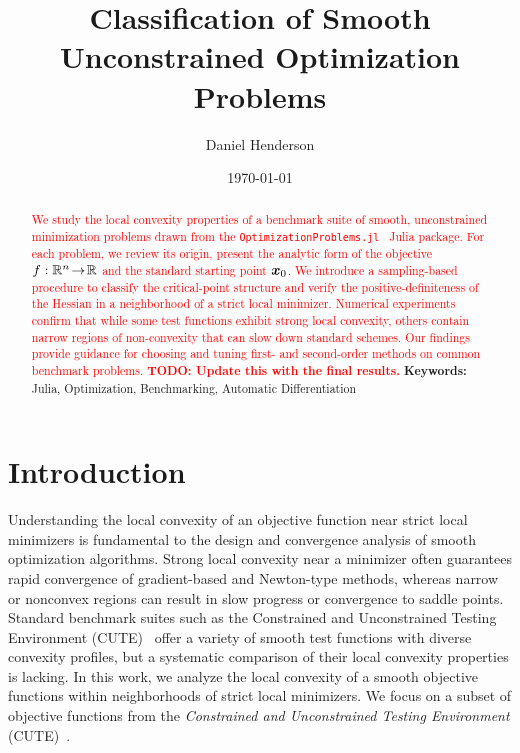 \documentclass[10pt]{article}
\title{Classification of Smooth Unconstrained Optimization Problems}
\author{Daniel Henderson}
\date{\today}
\begin{document}
\maketitle

\begin{abstract}
    \noindent
    \textcolor{Red}{
    We study the local convexity properties of a benchmark suite of smooth,
    unconstrained minimization problems drawn from the
    \texttt{OptimizationProblems.jl}~\cite{OptimizationProblems} Julia package.
    For each problem, we review its origin, present the analytic form
    of the objective $f:\mathbb{R}^n\!\to\!\mathbb{R}$ and the standard starting point
    $\bm{x}_0$.  We introduce a sampling-based procedure to classify
    the critical-point structure and verify the positive-definiteness of
    the Hessian in a neighborhood of a strict local minimizer.  Numerical
    experiments confirm that while some test functions exhibit strong
    local convexity, others contain narrow regions of non-convexity that
    can slow down standard schemes.  Our findings provide guidance for
    choosing and tuning first- and second-order methods on common
    benchmark problems.
    \textbf{TODO: Update this with the final results.}
    }
    \noindent\textbf{Keywords:} Julia, Optimization, Benchmarking, Automatic Differentiation
\end{abstract}



\tableofcontents
\newpage


\section{Introduction}
    \label{sec:intro}
    \medskip
    Understanding the local convexity of an objective function
    near strict local minimizers is fundamental to the design 
    and convergence analysis of smooth optimization algorithms. 
    Strong local convexity near a minimizer often guarantees rapid convergence 
    of gradient-based and Newton-type methods, whereas narrow or nonconvex regions 
    can result in slow progress or convergence to saddle points. 
    Standard benchmark suites such as the Constrained and Unconstrained Testing Environment 
    (CUTE)~\cite{CUTE} offer a variety of smooth test functions with diverse convexity profiles, 
    but a systematic comparison of their local convexity properties is lacking.
    In this work, we analyze the local convexity of a smooth objective functions
    within neighborhoods of strict local minimizers. We focus on a subset of objective functions
    from the \emph{Constrained and Unconstrained Testing Environment} (CUTE)~\cite{CUTE}.\
\end{document}
